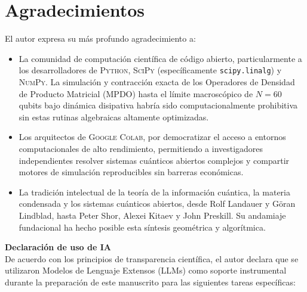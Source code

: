 \documentclass[12pt,a4paper]{article}
\theoremstyle{plain}
\theoremstyle{definition}
\theoremstyle{remark}
\begin{document}
\section*{Agradecimientos}
El autor expresa su más profundo agradecimiento a:

\begin{itemize}
    \item La comunidad de computación científica de código abierto, particularmente a los desarrolladores de \textsc{Python}, \textsc{SciPy} (específicamente \texttt{scipy.linalg}) y \textsc{NumPy}. La simulación y contracción exacta de los Operadores de Densidad de Producto Matricial (MPDO) hasta el límite macroscópico de $N=60$ qubits bajo dinámica disipativa habría sido computacionalmente prohibitiva sin estas rutinas algebraicas altamente optimizadas.
    \item Los arquitectos de \textsc{Google Colab}, por democratizar el acceso a entornos computacionales de alto rendimiento, permitiendo a investigadores independientes resolver sistemas cuánticos abiertos complejos y compartir motores de simulación reproducibles sin barreras económicas.
    \item La tradición intelectual de la teoría de la información cuántica, la materia condensada y los sistemas cuánticos abiertos, desde Rolf Landauer y Göran Lindblad, hasta Peter Shor, Alexei Kitaev y John Preskill. Su andamiaje fundacional ha hecho posible esta síntesis geométrica y algorítmica.
\end{itemize}

\vspace{0.3cm}
\noindent \textbf{Declaración de uso de IA} \\
De acuerdo con los principios de transparencia científica, el autor declara que se utilizaron Modelos de Lenguaje Extensos (LLMs) como soporte instrumental durante la preparación de este manuscrito para las siguientes tareas específicas:
\end{document}
